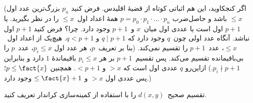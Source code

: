 \documentclass[../../../include/open-logic-section]{subfiles}
\begin{document}
(اگر کنجکاوید، این هم اثباتی کوتاه از قضیهٔ اقلیدس. فرض کنید $p_n$
بزرگ‌ترین عدد اول $\le x$ باشد و حاصل‌ضرب
$p=p_0\cdot p_1\cdot\dots\cdot p_n$ همهٔ اعداد اول~$\le x$ را در
نظر بگیرید. یا $p+1$ اول است یا عددی اول میان~$x$ و~$p+1$ وجود دارد.
چرا؟ فرض کنید $p+1$ اول نباشد. آنگاه عدد اولی چون~$q$ وجود دارد که
$q \mid p+1$ و $q<p+1$. هیچ‌یک از اعداد اول~$\le x$، عدد~$p+1$ را
تقسیم نمی‌کند. (بنا بر تعریف~$p$، هر عدد اول $p_i \le x$، عدد~$p$ را
بی‌باقیمانده تقسیم می‌کند. پس تقسیم~$p+1$ بر هر $p_i \le x$ باقیماندهٔ
$1$ دارد و بنابراین $p_i \nmid p+1$.) ازاین‌رو $q$ عددی اول است که
$>x$ و $<p+1$. همچنین $p \le \fact{x}$؛ پس عددی اول $>x$ و
$\le \fact{x}+1$ وجود دارد.)

\begin{prob}
تقسیم صحیح~$d(x,y)$ را با استفاده از کمینه‌سازی کراندار تعریف کنید.
\end{prob}
\end{document}
